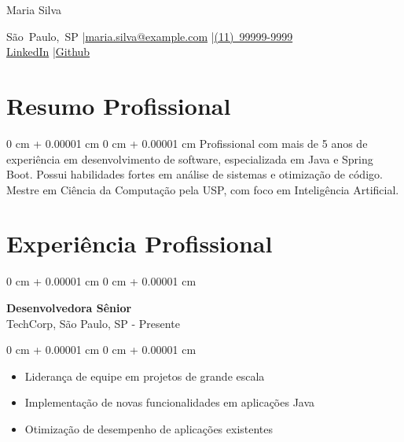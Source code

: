 \documentclass[10pt, letterpaper]{article}
\newenvironment{highlights}{
    \begin{itemize}[
        topsep=0.10 cm,
        parsep=0.10 cm,
        partopsep=0pt,
        itemsep=0pt,
        leftmargin=0 cm + 10pt
    ]
}{
    \end{itemize}
}
\newenvironment{onecolentry}{
    \begin{adjustwidth}{
        0 cm + 0.00001 cm
    }{
        0 cm + 0.00001 cm
    }
}{
    \end{adjustwidth}
}
\newenvironment{header}{
    \setlength{\topsep}{0pt}\par\kern\topsep\centering\linespread{1.5}
}{
    \par\kern\topsep
}
\begin{document}
\begin{header}
    {\fontsize{25pt}{25pt}\selectfont Maria Silva}

    \vspace{0pt}

    \normalsize
    \mbox{São Paulo, SP} \enskip|\enskip \mbox{\href{mailto:maria.silva@example.com}{maria.silva@example.com}} \enskip|\enskip \mbox{\href{tel:(11)999999999}{(11) 99999-9999}} \\
    \mbox{\href{https://www.linkedin.com/in/maria-silva}{LinkedIn}} \enskip|\enskip \mbox{\href{https://github.com/mariasilva}{Github}}
\end{header}

\vspace{5pt - 0.1cm}

\section{Resumo Profissional}
\begin{onecolentry}{Profissional com mais de 5 anos de experiência em desenvolvimento de software, especializada em Java e Spring Boot. Possui habilidades fortes em análise de sistemas e otimização de código. Mestre em Ciência da Computação pela USP, com foco em Inteligência Artificial.}\end{onecolentry}
\section{Experiência Profissional}

\begin{onecolentry}
    \setcolumnwidth{\fill, 4.5cm}
    \begin{paracol}{2}
        \textbf{Desenvolvedora Sênior} \\ TechCorp, São Paulo, SP
        \switchcolumn
         - Presente
    \end{paracol}
\end{onecolentry}
\vspace{0.10cm}
\begin{onecolentry}
    \begin{highlights}
                \item Liderança de equipe em projetos de grande escala
                \item Implementação de novas funcionalidades em aplicações Java
                \item Otimização de desempenho de aplicações existentes
    \end{highlights}
\end{onecolentry}
\end{document}
